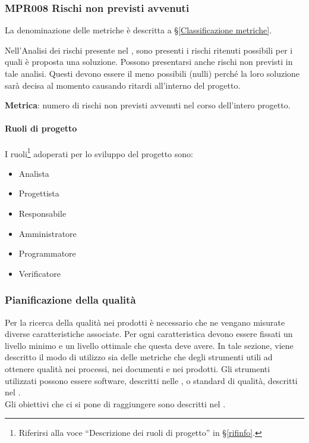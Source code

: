             \subsubsection{MPR008 Rischi non previsti avvenuti}
            La denominazione delle metriche è descritta a \S\ref{Classificazione metriche}.
            
            
            Nell'Analisi dei rischi presente nel \Doc{\PdPv}, sono presenti i rischi ritenuti possibili per i quali è proposta una soluzione.
            Possono presentarsi anche rischi non previsti in tale analisi. Questi devono essere il meno possibili (nulli) perché la loro soluzione sarà decisa al momento causando ritardi all'interno del progetto.
            
            \textbf{Metrica}: numero di rischi non previsti avvenuti nel corso dell'intero progetto.

			\paragraph{Ruoli di progetto}
			I ruoli\footnote{Riferirsi alla voce ``Descrizione dei ruoli di progetto'' in \S\ref{rifinfo}.} adoperati per lo sviluppo del progetto sono:
			\begin{itemize}[noitemsep]
				\item Analista
				\item Progettista
				\item Responsabile
				\item Amministratore
				\item Programmatore
				\item Verificatore
			\end{itemize}


		\subsubsection{Pianificazione della qualità}\label{PianificazioneQualità}
		Per la ricerca della qualità nei prodotti è necessario che ne vengano misurate diverse caratteristiche associate.
		Per ogni caratteristica devono essere fissati un livello minimo e un livello ottimale che questa deve avere.
		In tale sezione, viene descritto il modo di utilizzo sia delle metriche che degli strumenti utili ad ottenere qualità nei processi, nei documenti e nei prodotti.
		Gli strumenti utilizzati possono essere software, descritti nelle \Doc{\NdPv}, o standard di qualità, descritti nel \Doc{\PdQv}.\\
		Gli obiettivi che ci si pone di raggiungere sono descritti nel \Doc{\PdQv}.


